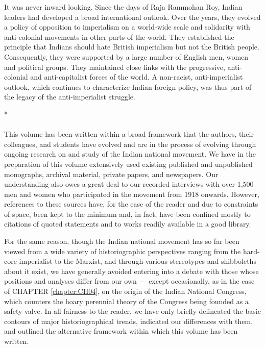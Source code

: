 It was never inward looking. Since the days of Raja Rammohan Roy, Indian leaders had developed a broad international outlook. Over the years, they evolved a policy of opposition to imperialism on a world-wide scale and solidarity with anti-colonial movements in other parts of the world. They established the principle that Indians should hate British imperialism but not the British people. Consequently, they were supported by a large number of English men, women and political groups. They maintained close links with the progressive, anti-colonial and anti-capitalist forces of the world. A non-racist, anti-imperialist outlook, which continues to characterize Indian foreign policy, was thus part of the legacy of the anti-imperialist struggle.

\begin{center}*\end{center}

\paragraph*{}
This volume has been written within a broad framework that the authors, their colleagues, and students have evolved and are in the process of evolving through ongoing research on and study of the Indian national movement. We have in the preparation of this volume extensively used existing published and unpublished monographs, archival material, private papers, and newspapers. Our understanding also owes a great deal to our recorded interviews with over 1,500 men and women who participated in the movement from 1918 onwards. However, references to these sources have, for the ease of the reader and due to constraints of space, been kept to the minimum and, in fact, have been confined mostly to citations of quoted statements and to works readily available in a good library.

For the same reason, though the Indian national movement has so far been viewed from a wide variety of historiographic perspectives ranging from the hard-core imperialist to the Marxist, and through various stereotypes and shibboleths about it exist, we have generally avoided entering into a debate with those whose positions and analyses differ from our own --- except occasionally, as in the case of CHAPTER \ref{chapter:CH04}, on the origin of the Indian National Congress, which counters the hoary perennial theory of the Congress being founded as a safety valve. In all fairness to the reader, we have only briefly delineated the basic contours of major historiographical trends, indicated our differences with them, and outlined the alternative framework within which this volume has been written.

